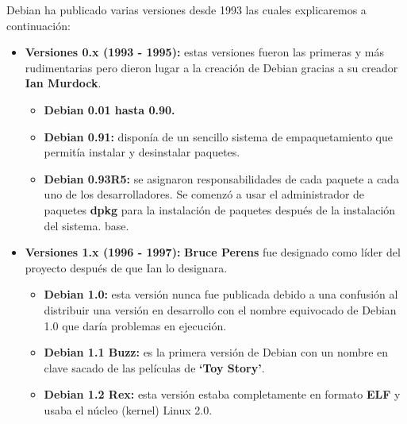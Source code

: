 \documentclass[a4paper, 12pt]{book}
\begin{document}
Debian ha publicado varias versiones desde 1993 las cuales explicaremos a continuación:

\begin{itemize}

	\item \textbf {Versiones 0.x (1993 - 1995):} estas versiones fueron las primeras y más rudimentarias pero dieron lugar a la creación de Debian gracias a su creador \textbf {Ian Murdock}.
	\begin{itemize}
		\item \textbf {Debian 0.01 hasta 0.90.}
		\item \textbf {Debian 0.91:} disponía de un sencillo sistema de empaquetamiento que permitía instalar y desinstalar paquetes.
		\item \textbf {Debian 0.93R5:}  se asignaron responsabilidades de cada paquete a cada uno de los desarrolladores. Se comenzó a usar el administrador de paquetes \textbf {dpkg} para la instalación de paquetes después de la instalación del sistema.
		base.
	\end{itemize}
	\item \textbf {Versiones 1.x (1996 - 1997):} \textbf{Bruce Perens} fue designado como líder del proyecto después de que Ian lo designara.
	\begin{itemize}
		\item \textbf {Debian 1.0:} esta versión nunca fue publicada debido a una confusión al distribuir una versión en desarrollo con el nombre equivocado de Debian 1.0 que daría problemas en ejecución.
		\item \textbf {Debian 1.1 Buzz: } es la primera versión de Debian con un nombre en clave sacado de las películas de \textbf {`Toy Story'}.
		\item \textbf {Debian 1.2 Rex: } esta versión estaba completamente en formato \textbf{ELF} y usaba el núcleo (kernel) Linux 2.0.
		

\end{itemize}
\end{itemize}
\end{document}
